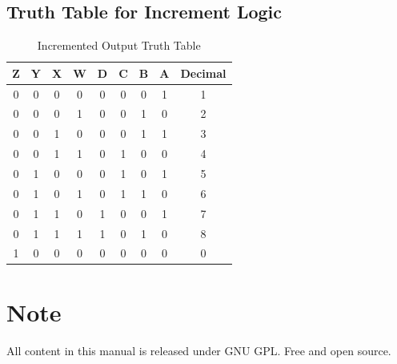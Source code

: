 \documentclass[12pt]{article}
\begin{document}
\subsection{Truth Table for Increment Logic}
\begin{table}[h!]
\centering
\begin{tabular}{|c|c|c|c|c|c|c|c|c|}
\hline
Z & Y & X & W & D & C & B & A & Decimal \\
\hline
0 & 0 & 0 & 0 & 0 & 0 & 0 & 1 & 1 \\
0 & 0 & 0 & 1 & 0 & 0 & 1 & 0 & 2 \\
0 & 0 & 1 & 0 & 0 & 0 & 1 & 1 & 3 \\
0 & 0 & 1 & 1 & 0 & 1 & 0 & 0 & 4 \\
0 & 1 & 0 & 0 & 0 & 1 & 0 & 1 & 5 \\
0 & 1 & 0 & 1 & 0 & 1 & 1 & 0 & 6 \\
0 & 1 & 1 & 0 & 1 & 0 & 0 & 1 & 7 \\
0 & 1 & 1 & 1 & 1 & 0 & 1 & 0 & 8 \\
1 & 0 & 0 & 0 & 0 & 0 & 0 & 0 & 0 \\
\hline
\end{tabular}
\caption{Incremented Output Truth Table}
\end{table}

\section*{Note}
All content in this manual is released under GNU GPL. Free and open source.
\end{document}
